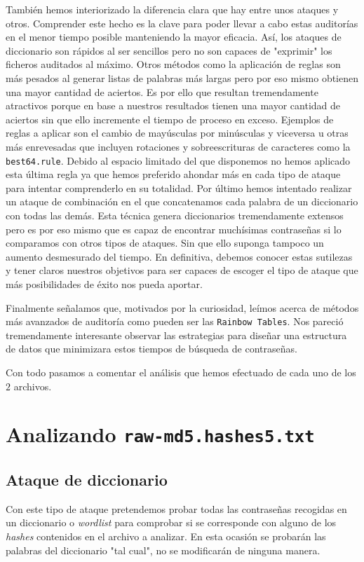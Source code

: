 \documentclass{article}
\begin{document}
        También hemos interiorizado la diferencia clara que hay entre unos ataques y otros. Comprender este hecho es la clave para poder llevar a cabo estas auditorías en el menor tiempo posible manteniendo la mayor eficacia. Así, los ataques de diccionario son rápidos al ser sencillos pero no son capaces de "exprimir" los ficheros auditados al máximo. Otros métodos como la aplicación de reglas son más pesados al generar listas de palabras más largas pero por eso mismo obtienen una mayor cantidad de aciertos. Es por ello que resultan tremendamente atractivos porque en base a nuestros resultados tienen una mayor cantidad de aciertos sin que ello incremente el tiempo de proceso en exceso. Ejemplos de reglas a aplicar son el cambio de mayúsculas por minúsculas y viceversa u otras más enrevesadas que incluyen rotaciones y sobreescrituras de caracteres como la \texttt{best64.rule}. Debido al espacio limitado del que disponemos no hemos aplicado esta última regla ya que hemos preferido ahondar más en cada tipo de ataque para intentar comprenderlo en su totalidad. Por último hemos intentado realizar un ataque de combinación en el que concatenamos cada palabra de un diccionario con todas las demás. Esta técnica genera diccionarios tremendamente extensos pero es por eso mismo que es capaz de encontrar muchísimas contraseñas si lo comparamos con otros tipos de ataques. Sin que ello suponga tampoco un aumento desmesurado del tiempo. En definitiva, debemos conocer estas sutilezas y tener claros nuestros objetivos para ser capaces de escoger el tipo de ataque que más posibilidades de éxito nos pueda aportar.

        Finalmente señalamos que, motivados por la curiosidad, leímos acerca de métodos más avanzados de auditoría como pueden ser las \texttt{Rainbow Tables}. Nos pareció tremendamente interesante observar las estrategias para diseñar una estructura de datos que minimizara estos tiempos de búsqueda de contraseñas.

        Con todo pasamos a comentar el análisis que hemos efectuado de cada uno de los $2$ archivos.

    \section{Analizando \texttt{raw-md5.hashes5.txt}}
        \subsection{Ataque de diccionario}
            Con este tipo de ataque pretendemos probar todas las contraseñas recogidas en un diccionario o \textit{wordlist} para comprobar si se corresponde con alguno de los \textit{hashes} contenidos en el archivo a analizar. En esta ocasión se probarán las palabras del diccionario "tal cual", no se modificarán de ninguna manera.
\end{document}
